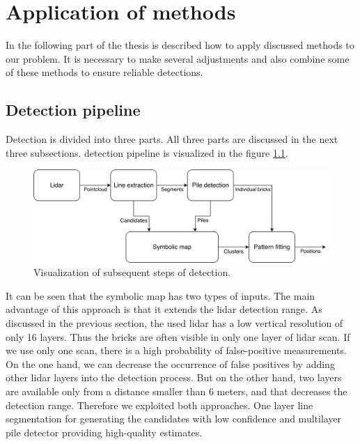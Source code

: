 \chapter{Application of methods}
In the following part of the thesis is described how to apply discussed methods to our problem. It is necessary to make several adjustments and also combine some of these methods to ensure reliable detections.

\section{Detection pipeline}
Detection is divided into three parts. All three parts are discussed in the next three subsections. detection pipeline is visualized in the figure \ref{fig:flowchart}. 

\hspace{5px}
\begin{figure}[H]
\centering
\includegraphics[scale=0.06]{fig/flowchart.pdf}
\caption[Program pipeline]{Visualization of subsequent steps of detection.}
\label{fig:flowchart}
\end{figure}

It can be seen that the symbolic map has two types of inputs. The main advantage of this approach is that it extends the lidar detection range. As discussed in the previous section, the used lidar has a low vertical resolution of only 16 layers. Thus the bricks are often visible in only one layer of lidar scan. If we use only one scan, there is a high probability of false-positive measurements. On the one hand, we can decrease the occurrence of false positives by adding other lidar layers into the detection process. But on the other hand, two layers are available only from a distance smaller than 6 meters, and that decreases the detection range. Therefore we exploited both approaches. One layer line segmentation for generating the candidates with low confidence and multilayer pile detector providing high-quality estimates.

